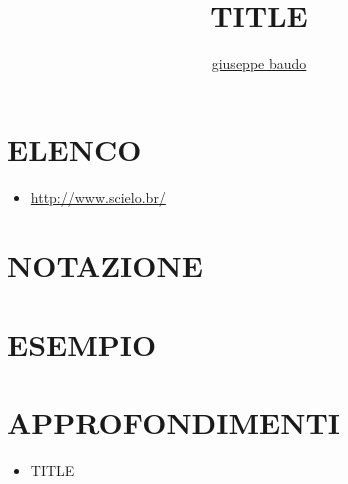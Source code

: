 \documentclass[a4paper,10pt]{article}
\title{TITLE}
\author{\href{http://www.baudo.hol.es}{giuseppe baudo}}
\begin{document}
\maketitle

\section{ELENCO}
\begin{itemize}
 \item \url{http://www.scielo.br/}
\end{itemize}


\section{NOTAZIONE}

\section{ESEMPIO}

\section{APPROFONDIMENTI}
\begin{itemize}
 \item TITLE
\end{itemize}
\end{document}
